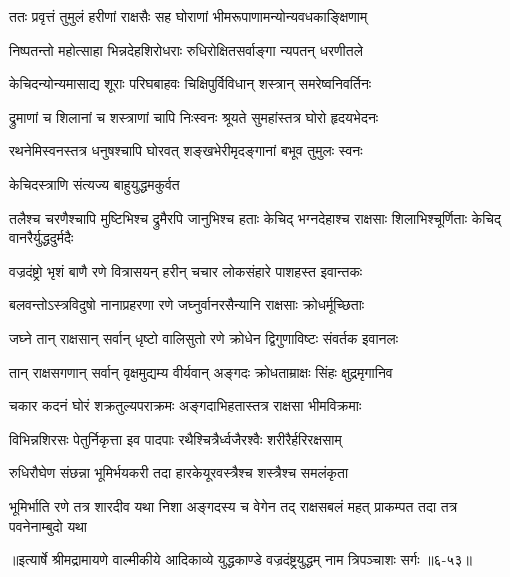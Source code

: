 \twolineshloka
{ततः प्रवृत्तं तुमुलं हरीणां राक्षसैः सह}
{घोराणां भीमरूपाणामन्योन्यवधकाङ्क्षिणाम्} %

\twolineshloka
{निष्पतन्तो महोत्साहा भिन्नदेहशिरोधराः}
{रुधिरोक्षितसर्वाङ्गा न्यपतन् धरणीतले} %

\twolineshloka
{केचिदन्योन्यमासाद्य शूराः परिघबाहवः}
{चिक्षिपुर्विविधान् शस्त्रान् समरेष्वनिवर्तिनः} %

\twolineshloka
{द्रुमाणां च शिलानां च शस्त्राणां चापि निःस्वनः}
{श्रूयते सुमहांस्तत्र घोरो हृदयभेदनः} %

\twolineshloka
{रथनेमिस्वनस्तत्र धनुषश्चापि घोरवत्}
{शङ्खभेरीमृदङ्गानां बभूव तुमुलः स्वनः} %

\onelineshloka
{केचिदस्त्राणि संत्यज्य बाहुयुद्धमकुर्वत} %

\threelineshloka
{तलैश्च चरणैश्चापि मुष्टिभिश्च द्रुमैरपि}
{जानुभिश्च हताः केचिद् भग्नदेहाश्च राक्षसाः}
{शिलाभिश्चूर्णिताः केचिद् वानरैर्युद्धदुर्मदैः} %

\twolineshloka
{वज्रदंष्ट्रो भृशं बाणै रणे वित्रासयन् हरीन्}
{चचार लोकसंहारे पाशहस्त इवान्तकः} %

\twolineshloka
{बलवन्तोऽस्त्रविदुषो नानाप्रहरणा रणे}
{जघ्नुर्वानरसैन्यानि राक्षसाः क्रोधर्मूच्छिताः} %

\twolineshloka
{जघ्ने तान् राक्षसान् सर्वान् धृष्टो वालिसुतो रणे}
{क्रोधेन द्विगुणाविष्टः संवर्तक इवानलः} %

\twolineshloka
{तान् राक्षसगणान् सर्वान् वृक्षमुद्यम्य वीर्यवान्}
{अङ्गदः क्रोधताम्राक्षः सिंहः क्षुद्रमृगानिव} %

\twolineshloka
{चकार कदनं घोरं शक्रतुल्यपराक्रमः}
{अङ्गदाभिहतास्तत्र राक्षसा भीमविक्रमाः} %

\twolineshloka
{विभिन्नशिरसः पेतुर्निकृत्ता इव पादपाः}
{रथैश्चित्रैर्ध्वजैरश्वैः शरीरैर्हरिरक्षसाम्} %

\twolineshloka
{रुधिरौघेण संछन्ना भूमिर्भयकरी तदा}
{हारकेयूरवस्त्रैश्च शस्त्रैश्च समलंकृता} %

\threelineshloka
{भूमिर्भाति रणे तत्र शारदीव यथा निशा}
{अङ्गदस्य च वेगेन तद् राक्षसबलं महत्}
{प्राकम्पत तदा तत्र पवनेनाम्बुदो यथा} %


॥इत्यार्षे श्रीमद्रामायणे वाल्मीकीये आदिकाव्ये युद्धकाण्डे वज्रदंष्ट्रयुद्धम् नाम त्रिपञ्चाशः सर्गः ॥६-५३॥
